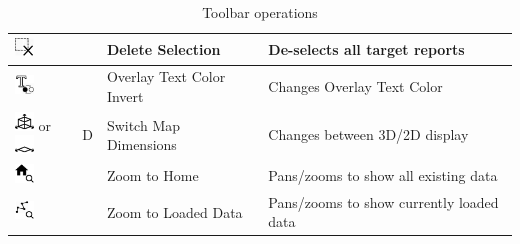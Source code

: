 \begin{table}[H]
\begin{tabular}{ | l | l | l | l |}
    \includegraphics[width=0.5cm,frame]{../../data/icons/select_delete.png} & & Delete Selection & De-selects all target reports \\ \hline
    \includegraphics[width=0.5cm,frame]{../../data/icons/text_invert.png} & & Overlay Text Color Invert & Changes Overlay Text Color \\ \hline
    \includegraphics[width=0.5cm,frame]{../../data/icons/3d.png} or \includegraphics[width=0.5cm,frame]{../../data/icons/2d.png} & D & Switch Map Dimensions & Changes between 3D/2D display \\ \hline
    \includegraphics[width=0.5cm,frame]{../../data/icons/zoom_home.png} & & Zoom to Home & Pans/zooms to show all existing data \\ \hline
    \includegraphics[width=0.5cm,frame]{../../data/icons/zoom_geometry.png} & & Zoom to Loaded Data & Pans/zooms to show currently loaded data \\ \hline
  \end{tabular}
  \caption{Toolbar operations}
\end{table} 

